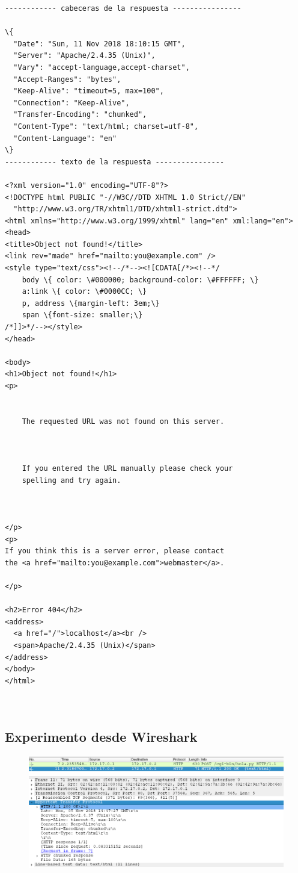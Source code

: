 \documentclass[12pt]{extarticle}
\begin{document}
    \begin{Verbatim}[commandchars=\\\{\}]
------------ cabeceras de la respuesta ----------------

\{
  "Date": "Sun, 11 Nov 2018 18:10:15 GMT",
  "Server": "Apache/2.4.35 (Unix)",
  "Vary": "accept-language,accept-charset",
  "Accept-Ranges": "bytes",
  "Keep-Alive": "timeout=5, max=100",
  "Connection": "Keep-Alive",
  "Transfer-Encoding": "chunked",
  "Content-Type": "text/html; charset=utf-8",
  "Content-Language": "en"
\}
------------ texto de la respuesta ----------------

<?xml version="1.0" encoding="UTF-8"?>
<!DOCTYPE html PUBLIC "-//W3C//DTD XHTML 1.0 Strict//EN"
  "http://www.w3.org/TR/xhtml1/DTD/xhtml1-strict.dtd">
<html xmlns="http://www.w3.org/1999/xhtml" lang="en" xml:lang="en">
<head>
<title>Object not found!</title>
<link rev="made" href="mailto:you@example.com" />
<style type="text/css"><!--/*--><![CDATA[/*><!--*/ 
    body \{ color: \#000000; background-color: \#FFFFFF; \}
    a:link \{ color: \#0000CC; \}
    p, address \{margin-left: 3em;\}
    span \{font-size: smaller;\}
/*]]>*/--></style>
</head>

<body>
<h1>Object not found!</h1>
<p>


    The requested URL was not found on this server.

  

    If you entered the URL manually please check your
    spelling and try again.

  

</p>
<p>
If you think this is a server error, please contact
the <a href="mailto:you@example.com">webmaster</a>.

</p>

<h2>Error 404</h2>
<address>
  <a href="/">localhost</a><br />
  <span>Apache/2.4.35 (Unix)</span>
</address>
</body>
</html>



    \end{Verbatim}

    \subsection{Experimento desde
Wireshark}\label{experimento-desde-wireshark}

\begin{figure}[h]
\centering
\includegraphics{images/pto1.png}
\caption{}
\end{figure}
\end{document}

